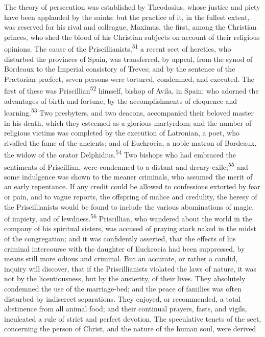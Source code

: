 The theory of persecution was established by Theodosius, whose
justice and piety have been applauded by the saints: but the
practice of it, in the fullest extent, was reserved for his rival
and colleague, Maximus, the first, among the Christian princes,
who shed the blood of his Christian subjects on account of their
religious opinions. The cause of the Priscillianists,\textsuperscript{51} a recent
sect of heretics, who disturbed the provinces of Spain, was
transferred, by appeal, from the synod of Bordeaux to the
Imperial consistory of Treves; and by the sentence of the
Prætorian præfect, seven persons were tortured, condemned, and
executed. The first of these was Priscillian\textsuperscript{52} himself, bishop
of Avila, in Spain; who adorned the advantages of birth and
fortune, by the accomplishments of eloquence and learning.\textsuperscript{53} Two
presbyters, and two deacons, accompanied their beloved master in
his death, which they esteemed as a glorious martyrdom; and the
number of religious victims was completed by the execution of
Latronian, a poet, who rivalled the fame of the ancients; and of
Euchrocia, a noble matron of Bordeaux, the widow of the orator
Delphidius.\textsuperscript{54} Two bishops who had embraced the sentiments of
Priscillian, were condemned to a distant and dreary exile;\textsuperscript{55} and
some indulgence was shown to the meaner criminals, who assumed
the merit of an early repentance. If any credit could be allowed
to confessions extorted by fear or pain, and to vague reports,
the offspring of malice and credulity, the heresy of the
Priscillianists would be found to include the various
abominations of magic, of impiety, and of lewdness.\textsuperscript{56}
Priscillian, who wandered about the world in the company of his
spiritual sisters, was accused of praying stark naked in the
midst of the congregation; and it was confidently asserted, that
the effects of his criminal intercourse with the daughter of
Euchrocia had been suppressed, by means still more odious and
criminal. But an accurate, or rather a candid, inquiry will
discover, that if the Priscillianists violated the laws of
nature, it was not by the licentiousness, but by the austerity,
of their lives. They absolutely condemned the use of the
marriage-bed; and the peace of families was often disturbed by
indiscreet separations. They enjoyed, or recommended, a total
abstinence from all animal food; and their continual prayers,
fasts, and vigils, inculcated a rule of strict and perfect
devotion. The speculative tenets of the sect, concerning the
person of Christ, and the nature of the human soul, were derived
